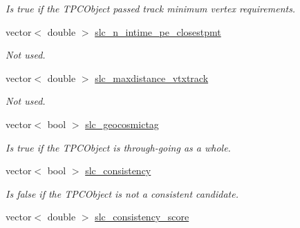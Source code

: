 \begin{DoxyCompactItemize}
\begin{DoxyCompactList}\small\item\em Is true if the T\-P\-C\-Object passed track minimum vertex requirements. \end{DoxyCompactList}\item 
\hypertarget{classUBXSecEvent_a8234ab4e219c1355370b5f141ad10211}{vector$<$ double $>$ \hyperlink{classUBXSecEvent_a8234ab4e219c1355370b5f141ad10211}{slc\-\_\-n\-\_\-intime\-\_\-pe\-\_\-closestpmt}}\label{classUBXSecEvent_a8234ab4e219c1355370b5f141ad10211}

\begin{DoxyCompactList}\small\item\em Not used. \end{DoxyCompactList}\item 
\hypertarget{classUBXSecEvent_afbcefec1936192c7a46b3414d7f3067d}{vector$<$ double $>$ \hyperlink{classUBXSecEvent_afbcefec1936192c7a46b3414d7f3067d}{slc\-\_\-maxdistance\-\_\-vtxtrack}}\label{classUBXSecEvent_afbcefec1936192c7a46b3414d7f3067d}

\begin{DoxyCompactList}\small\item\em Not used. \end{DoxyCompactList}\item 
\hypertarget{classUBXSecEvent_a5bf2adbb96dee74effb2efb02ca73ca6}{vector$<$ bool $>$ \hyperlink{classUBXSecEvent_a5bf2adbb96dee74effb2efb02ca73ca6}{slc\-\_\-geocosmictag}}\label{classUBXSecEvent_a5bf2adbb96dee74effb2efb02ca73ca6}

\begin{DoxyCompactList}\small\item\em Is true if the T\-P\-C\-Object is through-\/going as a whole. \end{DoxyCompactList}\item 
\hypertarget{classUBXSecEvent_a549ad5d4e82d19528f79d0074cd4a7d4}{vector$<$ bool $>$ \hyperlink{classUBXSecEvent_a549ad5d4e82d19528f79d0074cd4a7d4}{slc\-\_\-consistency}}\label{classUBXSecEvent_a549ad5d4e82d19528f79d0074cd4a7d4}

\begin{DoxyCompactList}\small\item\em Is false if the T\-P\-C\-Object is not a consistent candidate. \end{DoxyCompactList}\item 
\hypertarget{classUBXSecEvent_af7293625860342c3e57b02da4cacf863}{vector$<$ double $>$ \hyperlink{classUBXSecEvent_af7293625860342c3e57b02da4cacf863}{slc\-\_\-consistency\-\_\-score}}\label{classUBXSecEvent_af7293625860342c3e57b02da4cacf863}


\end{DoxyCompactItemize}
